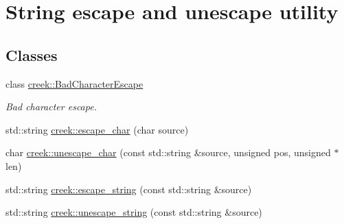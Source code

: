 \hypertarget{group__utility__string__escape}{}\section{String escape and unescape utility}
\label{group__utility__string__escape}
\subsection*{Classes}
\begin{DoxyCompactItemize}
\item 
class \hyperlink{classcreek_1_1_bad_character_escape}{creek\+::\+Bad\+Character\+Escape}
\begin{DoxyCompactList}\small\item\em Bad character escape. \end{DoxyCompactList}\end{DoxyCompactItemize}
\begin{DoxyCompactItemize}
\item 
std\+::string \hyperlink{group__utility__string__escape_ga8b7a55e4e56ac6a74672ad801774bcc1}{creek\+::escape\+\_\+char} (char source)
\item 
char \hyperlink{group__utility__string__escape_ga43eac86df9b1d39b5d244aae74f7785c}{creek\+::unescape\+\_\+char} (const std\+::string \&source, unsigned pos, unsigned $\ast$len)
\item 
std\+::string \hyperlink{group__utility__string__escape_ga12182d1374fcd21fa1c7b2555a1f54a5}{creek\+::escape\+\_\+string} (const std\+::string \&source)
\item 
std\+::string \hyperlink{group__utility__string__escape_gab8486c78d9dd453b6ffb47996b5043dd}{creek\+::unescape\+\_\+string} (const std\+::string \&source)
\end{DoxyCompactItemize}


